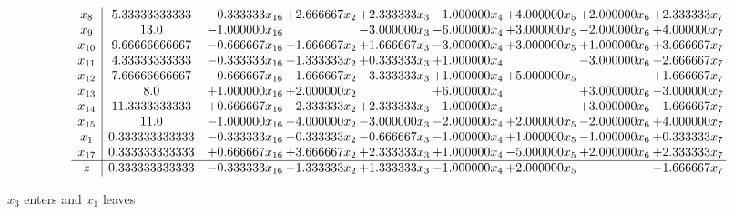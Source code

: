 \documentclass[10pt]{article}
\begin{document}
 \[\begin{array}{c| c c@{\hskip 2pt} c@{\hskip 2pt} c@{\hskip 2pt} c@{\hskip 2pt} c@{\hskip 2pt} c@{\hskip 2pt} c@{\hskip 2pt} }
 x_{8}   &  5.33333333333 & -0.333333 x_{16} & + 2.666667 x_{2} & + 2.333333 x_{3} & -1.000000 x_{4} & + 4.000000 x_{5} & + 2.000000 x_{6} & + 2.333333 x_{7}\\
 x_{9}   &  13.0 & -1.000000 x_{16} &   & -3.000000 x_{3} & -6.000000 x_{4} & + 3.000000 x_{5} & -2.000000 x_{6} & + 4.000000 x_{7}\\
 x_{10}   &  9.66666666667 & -0.666667 x_{16} & -1.666667 x_{2} & + 1.666667 x_{3} & -3.000000 x_{4} & + 3.000000 x_{5} & + 1.000000 x_{6} & + 3.666667 x_{7}\\
 x_{11}   &  4.33333333333 & -0.333333 x_{16} & -1.333333 x_{2} & + 0.333333 x_{3} & + 1.000000 x_{4} &   & -3.000000 x_{6} & -2.666667 x_{7}\\
 x_{12}   &  7.66666666667 & -0.666667 x_{16} & -1.666667 x_{2} & -3.333333 x_{3} & + 1.000000 x_{4} & + 5.000000 x_{5} &   & + 1.666667 x_{7}\\
 x_{13}   &  8.0 & + 1.000000 x_{16} & + 2.000000 x_{2} &   & + 6.000000 x_{4} &   & + 3.000000 x_{6} & -3.000000 x_{7}\\
 x_{14}   &  11.3333333333 & + 0.666667 x_{16} & -2.333333 x_{2} & + 2.333333 x_{3} & -1.000000 x_{4} &   & + 3.000000 x_{6} & -1.666667 x_{7}\\
 x_{15}   &  11.0 & -1.000000 x_{16} & -4.000000 x_{2} & -3.000000 x_{3} & -2.000000 x_{4} & + 2.000000 x_{5} & -2.000000 x_{6} & + 4.000000 x_{7}\\
 x_{1}   &  0.333333333333 & -0.333333 x_{16} & -0.333333 x_{2} & -0.666667 x_{3} & -1.000000 x_{4} & + 1.000000 x_{5} & -1.000000 x_{6} & + 0.333333 x_{7}\\
 x_{17}   &  0.333333333333 & + 0.666667 x_{16} & + 3.666667 x_{2} & + 2.333333 x_{3} & + 1.000000 x_{4} & -5.000000 x_{5} & + 2.000000 x_{6} & + 2.333333 x_{7}\\
\hline
z    &  0.333333333333 & -0.333333 x_{16} & -1.333333 x_{2} & + 1.333333 x_{3} & -1.000000 x_{4} & + 2.000000 x_{5} &   & -1.666667 x_{7}\\
\end{array}\]


 $ x_{3} $ enters and $ x_{1} $ leaves 
\end{document}
